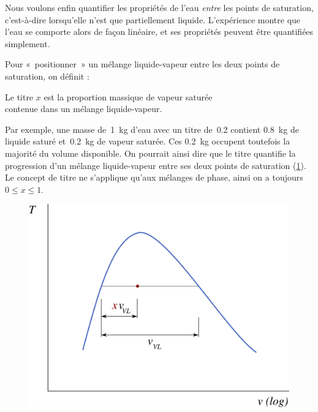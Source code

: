 		Nous voulons enfin quantifier les propriétés de l’eau \emph{entre} les points de saturation, c’est-à-dire lorsqu’elle n’est que partiellement liquide. L’expérience montre que l’eau se comporte alors de façon linéaire, et ses propriétés peuvent être quantifiées simplement.

		Pour «~positionner~» un mélange liquide-vapeur entre les deux points de saturation, on définit  :

		\begin{trucimportant}
		Le titre $x$ est la proportion massique de vapeur saturée\\ contenue dans un mélange liquide-vapeur.
		\end{trucimportant}

		Par exemple, une masse de~\SI{1}{\kilogram} d’eau avec un titre de~\num{0,2} contient \SI{0,8}{\kilogram} de liquide saturé et~\SI{0,2}{\kilogram} de vapeur saturée. Ces \SI{0,2}{\kilogram} occupent toutefois la majorité du volume disponible. On pourrait ainsi dire que le titre quantifie la progression d’un mélange liquide-vapeur entre ses deux points de saturation (\cref{fig_notion_de_titre}). Le concept de titre ne s’applique qu’aux mélanges de phase, ainsi on a toujours $0 \leq x \leq 1$.

		\begin{figure}
			\begin{center}
				\includegraphics[width=\didacticpvdiagramwidth]{images/titre_tv_v1.png}
			\end{center}
			\label{fig_notion_de_titre}
		\end{figure}
		
